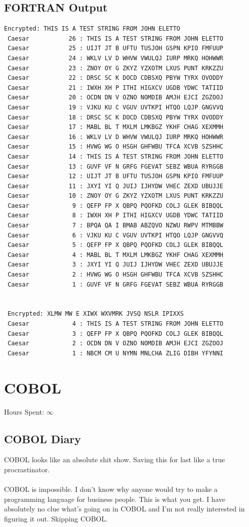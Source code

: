 \documentclass{report}
\begin{document}
\subsection*{FORTRAN Output}
\begin{lstlisting}
Encrypted: THIS IS A TEST STRING FROM JOHN ELETTO
 Caesar           26 : THIS IS A TEST STRING FROM JOHN ELETTO
 Caesar           25 : UIJT JT B UFTU TUSJOH GSPN KPIO FMFUUP
 Caesar           24 : WKLV LV D WHVW VWULQJ IURP MRKQ HOHWWR
 Caesar           23 : ZNOY OY G ZKYZ YZXOTM LXUS PUNT KRKZZU
 Caesar           22 : DRSC SC K DOCD CDBSXQ PBYW TYRX OVODDY
 Caesar           21 : IWXH XH P ITHI HIGXCV UGDB YDWC TATIID
 Caesar           20 : OCDN DN V OZNO NOMDIB AMJH EJCI ZGZOOJ
 Caesar           19 : VJKU KU C VGUV UVTKPI HTQO LQJP GNGVVQ
 Caesar           18 : DRSC SC K DOCD CDBSXQ PBYW TYRX OVODDY
 Caesar           17 : MABL BL T MXLM LMKBGZ YKHF CHAG XEXMMH
 Caesar           16 : WKLV LV D WHVW VWULQJ IURP MRKQ HOHWWR
 Caesar           15 : HVWG WG O HSGH GHFWBU TFCA XCVB SZSHHC
 Caesar           14 : THIS IS A TEST STRING FROM JOHN ELETTO
 Caesar           13 : GUVF VF N GRFG FGEVAT SEBZ WBUA RYRGGB
 Caesar           12 : UIJT JT B UFTU TUSJOH GSPN KPIO FMFUUP
 Caesar           11 : JXYI YI Q JUIJ IJHYDW VHEC ZEXD UBUJJE
 Caesar           10 : ZNOY OY G ZKYZ YZXOTM LXUS PUNT KRKZZU
 Caesar            9 : QEFP FP X QBPQ PQOFKD COLJ GLEK BIBQQL
 Caesar            8 : IWXH XH P ITHI HIGXCV UGDB YDWC TATIID
 Caesar            7 : BPQA QA I BMAB ABZQVO NZWU RWPV MTMBBW
 Caesar            6 : VJKU KU C VGUV UVTKPI HTQO LQJP GNGVVQ
 Caesar            5 : QEFP FP X QBPQ PQOFKD COLJ GLEK BIBQQL
 Caesar            4 : MABL BL T MXLM LMKBGZ YKHF CHAG XEXMMH
 Caesar            3 : JXYI YI Q JUIJ IJHYDW VHEC ZEXD UBUJJE
 Caesar            2 : HVWG WG O HSGH GHFWBU TFCA XCVB SZSHHC
 Caesar            1 : GUVF VF N GRFG FGEVAT SEBZ WBUA RYRGGB
 
 
 Encrypted: XLMW MW E XIWX WXVMRK JVSQ NSLR IPIXXS
 Caesar            4 : THIS IS A TEST STRING FROM JOHN ELETTO
 Caesar            3 : QEFP FP X QBPQ PQOFKD COLJ GLEK BIBQQL
 Caesar            2 : OCDN DN V OZNO NOMDIB AMJH EJCI ZGZOOJ
 Caesar            1 : NBCM CM U NYMN MNLCHA ZLIG DIBH YFYNNI
\end{lstlisting}

\section*{COBOL}
Hours Spent: $\infty$
\subsection*{COBOL Diary}
COBOL looks like an absolute shit show. Saving this for last like a true procrastinator.
\\
\\
COBOL is impossible. I don't know why anyone would try to make a programming language for 
business people. This is what you get. I have absolutely no clue what's going 
on in COBOL and I'm not really interested in figuring it out. Skipping COBOL.
\end{document}
